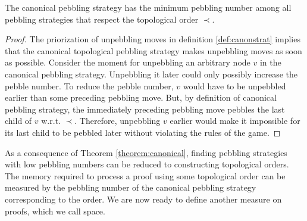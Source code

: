 \begin{theorem}
\label{theorem:canonical}
The canonical pebbling strategy has the minimum pebbling number among all pebbling strategies that respect the topological order $\prec$.
\end{theorem}
\begin{proof}
%
The priorization of unpebbling moves in definition \ref{def:canonstrat} implies that the canonical topological pebbling strategy makes unpebbling moves as soon as possible.
Consider the moment for unpebbling an arbitrary node $v$ in the canonical pebbling strategy. 
Unpebbling it later could only possibly increase the pebble number. 
To reduce the pebble number, $v$ would have to be unpebbled earlier than some preceding pebbling move. 
But, by definition of canonical pebbling strategy, the immediately preceding pebbling move pebbles the last child of $v$ w.r.t. $\prec$. 
Therefore, unpebbling $v$ earlier would make it impossible for its last child to be pebbled later without violating the rules of the game.
\end{proof}

As a consequence of Theorem \ref{theorem:canonical}, finding pebbling strategies with low pebbling numbers can be reduced to constructing topological orders.
The memory required to process a proof using some topological order can be measured by the pebbling number of the canonical pebbling strategy corresponding to the order.
We are now ready to define another measure on proofs, which we call space.

